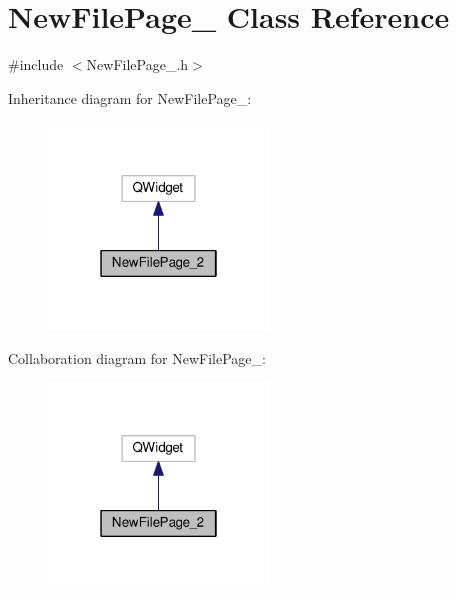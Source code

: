 \hypertarget{class_new_file_page__2}{\section{New\-File\-Page\-\_ Class Reference}
\label{class_new_file_page__2}
}


{\ttfamily \#include $<$New\-File\-Page\-\_.\-h$>$}



Inheritance diagram for New\-File\-Page\-\_\-:\nopagebreak
\begin{figure}[H]
\begin{center}
\leavevmode
\includegraphics[width=166pt]{class_new_file_page__2__inherit__graph}
\end{center}
\end{figure}


Collaboration diagram for New\-File\-Page\-\_\-:\nopagebreak
\begin{figure}[H]
\begin{center}
\leavevmode
\includegraphics[width=166pt]{class_new_file_page__2__coll__graph}
\end{center}
\end{figure}
